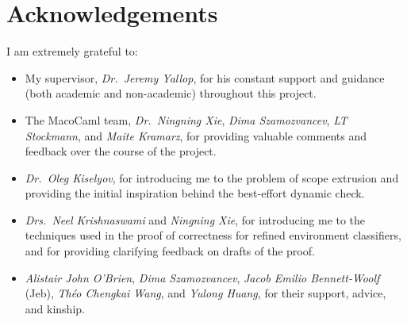 \chapter*{Acknowledgements}

I am extremely grateful to:
\begin{itemize}
  \item My supervisor, \textit{Dr.\ Jeremy Yallop}, for his constant support and guidance (both academic and non-academic) throughout this project. 
  \item The MacoCaml team, \textit{Dr.\ Ningning Xie}, \textit{Dima Szamozvancev}, \textit{LT Stockmann}, and \textit{Maite Kramarz}, for providing valuable comments and feedback over the course of the project. 
  \item \textit{Dr.\ Oleg Kiselyov}, for introducing me to the problem of scope extrusion and providing the initial inspiration behind the best-effort dynamic check. 
  \item \textit{Drs.\ Neel Krishnaswami} and \textit{Ningning Xie}, for introducing me to the techniques used in the proof of correctness for refined environment classifiers, and for providing clarifying feedback on drafts of the proof. 
  \item  \textit{Alistair John O'Brien}, \textit{Dima Szamozvancev}, \textit{Jacob Emilio Bennett-Woolf} (Jeb), \textit{Théo Chengkai Wang}, and \textit{Yulong Huang}, for their support, advice, and kinship.

\end{itemize}